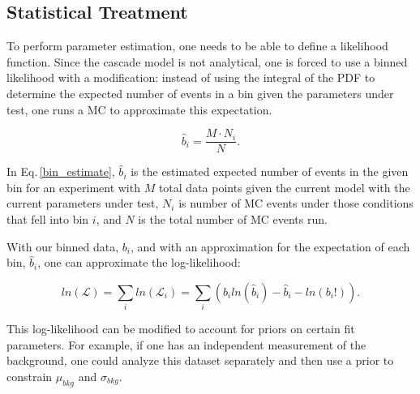 \documentclass[11pt,a4paper]{article}
\newcommand\eqnref[1]{Eq.\,\ref{#1}}
\begin{document}





\subsection{\label{sec:level2-1}Statistical Treatment}

To perform parameter estimation, one needs to be able to define a likelihood function.  Since the cascade model is not analytical, one is forced to use a binned likelihood with a modification: instead of using the integral of the PDF to determine the expected number of events in a bin given the parameters under test, one runs a MC to approximate this expectation. 

\begin{equation}
\label{bin_estimate}
\hat{b}_i = \frac{M \cdot N_i}{N}.
\end{equation}

In \eqnref{bin_estimate}, $\hat{b}_i$ is the estimated expected number of events in the given bin for an experiment with $M$ total data points given the current model with the current parameters under test, $N_i$ is number of MC events under those conditions that fell into bin $i$, and $N$ is the total number of MC events run.

With our binned data, $b_i$, and with an approximation for the expectation of each bin, $\hat{b}_i$, one can approximate the log-likelihood:

\begin{equation} \label{eq:log-likelihood}
ln(\mathcal{L}) = \sum_i ln(\mathcal{L}_i) = \sum_i ( b_i ln(\hat{b}_i) - \hat{b}_i - ln(b_i!)).
\end{equation}

This log-likelihood can be modified to account for priors on certain fit parameters.  For example, if one has an independent measurement of the background, one could analyze this dataset separately and then use a prior to constrain $\mu_{bkg}$ and $\sigma_{bkg}$.
\end{document}

